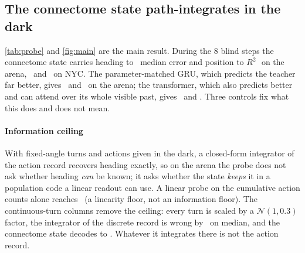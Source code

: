 \subsection{The connectome state path-integrates in the dark}
\label{sec:probes}

\begin{table}[t]
  \centering\small
  \setlength{\tabcolsep}{3.5pt}
  
  \caption{\textbf{Heading and position decoded from the state during 8 blind steps.} Ridge probe; median absolute
  heading error in degrees and position $R^2$ relative to the start of the window, mean\pm sd over seeds. With
  continuous turn angles the action record no longer determines heading, so the integrator row is no longer exact and
  the probe measures integration of a noisy signal. The connectome keeps a linearly readable heading and position code
  that neither the GRU nor the transformer forms; sparse controls of the same size form a slightly worse one.}
  \label{tab:probe}
\end{table}

\cref{tab:probe} and \cref{fig:main} are the main result. During the 8 blind steps the connectome state carries heading
to \nConnArenaHd\degree\ median error and position to $R^2$\,\nConnArenaPos\ on the arena, \nConnNycHd\degree\ and
\nConnNycPos\ on NYC. The parameter-matched GRU, which predicts the teacher far better, gives \nGruArenaHd\degree\ and
\nGruArenaPos\ on the arena; the transformer, which also predicts better and can attend over its whole visible past,
gives \nTfArenaHd\degree\ and \nTfArenaPos. Three controls fix what this does and does not mean.

\paragraph{Information ceiling} With fixed-angle turns and actions given in the dark, a closed-form integrator of the
action record recovers heading exactly, so on the arena the probe does not ask whether heading \emph{can} be known; it
asks whether the state \emph{keeps} it in a population code a linear readout can use. A linear probe on the cumulative
action counts alone reaches \nActOnlyArenaHd\degree\ (a linearity floor, not an information floor). The continuous-turn
columns remove the ceiling: every turn is scaled by a $\mathcal{N}(1, 0.3)$ factor, the integrator of the discrete record
is wrong by \nIntegratorTnHd\degree\ on median, and the connectome state decodes to \nConnTnHd\degree. Whatever it
integrates there is not the action record.

